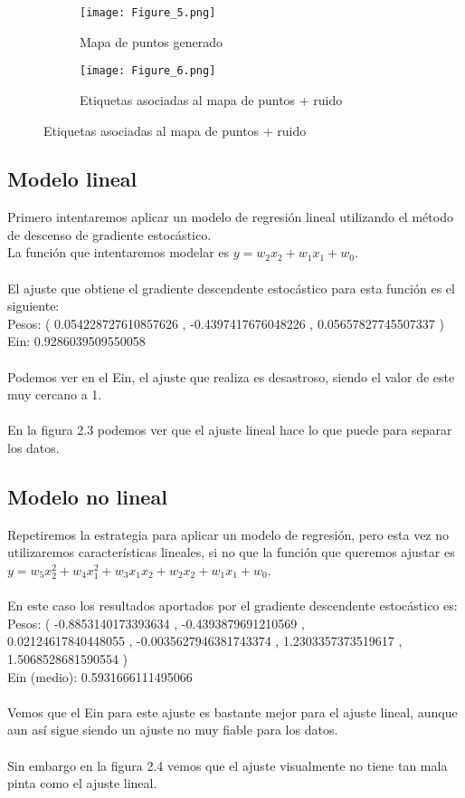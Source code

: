 \begin{figure}[h]
   \centering
   \begin{subfigure}[b]{0.45\textwidth}
      \texttt{[image: Figure\_5.png]}
      \caption{Mapa de puntos generado}
   \end{subfigure}
   \hfill
   \begin{subfigure}[b]{0.45\textwidth}
      \texttt{[image: Figure\_6.png]}
      \caption{Etiquetas asociadas al mapa de puntos + ruido}
   \end{subfigure}
\end{figure}


\subsection{Modelo lineal}
Primero intentaremos aplicar un modelo de regresión lineal utilizando el método de descenso de gradiente estocástico.\\
La función que intentaremos modelar es $ y = w_{2}x_{2} + w_{1}x_{1} + w_{0} $.\\
\\
El ajuste que obtiene el gradiente descendente estocástico para esta función es el siguiente:\\
Pesos: ( 0.054228727610857626 ,  -0.4397417676048226 ,  0.05657827745507337 )\\
Ein:  0.9286039509550058\\
\\
Podemos ver en el Ein, el ajuste que realiza es desastroso, siendo el valor de este muy cercano a 1.\\
\\
En la figura 2.3 podemos ver que el ajuste lineal hace lo que puede para separar los datos.

\subsection{Modelo no lineal}
Repetiremos la estrategia para aplicar un modelo de regresión, pero esta vez no utilizaremos características lineales, si no que la función que queremos ajustar es $ y = w_{5}x_{2}^{2} + w_{4}x_{1}^{2} + w_{3}x_{1}x_{2} + w_{2}x_{2} + w_{1}x_{1} + w_{0} $.\\
\\
En este caso los resultados aportados por el gradiente descendente estocástico es:\\
Pesos: ( -0.8853140173393634 ,  -0.4393879691210569 ,  \\
0.02124617840448055 ,  -0.0035627946381743374 ,  1.2303357373519617 ,  1.5068528681590554 )\\
Ein (medio):  0.5931666111495066\\
\\
Vemos que el Ein para este ajuste es bastante mejor para el ajuste lineal, aunque aun así sigue siendo un ajuste no muy fiable para los datos.\\
\\
Sin embargo en la figura 2.4 vemos que el ajuste visualmente no tiene tan mala pinta como el ajuste lineal.

